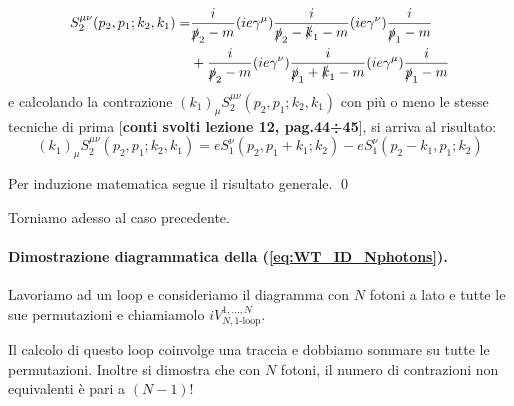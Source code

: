 \documentclass[../main.tex]{subfiles}
\begin{document}
\begin{itemize}
    \begin{align*}
    S_2^{\mu\nu}(p_2,p_1;k_2,k_1) = &\frac{i}{\slashed p_2 - m}(ie\gamma^\mu)\frac{i}{\slashed p_2 - \slashed k_1 - m}(ie\gamma^\nu)\frac{i}{\slashed p_1 - m} \\
    &+ \frac{i}{\slashed p_2 - m}(ie\gamma^\nu)\frac{i}{\slashed p_1 + \slashed k_1 - m}(ie\gamma^\mu)\frac{i}{\slashed p_1 - m}
    \end{align*}
    e calcolando la contrazione \((k_1)_\mu S_2^{\mu\nu}(p_2,p_1;k_2,k_1)\) con più o meno le stesse tecniche di prima [\textbf{conti svolti lezione 12, pag.44÷45}], si arriva al risultato:
    \[ \boxed{(k_1)_\mu S_2^{\mu\nu}(p_2,p_1;k_2,k_1) = eS_1^{\nu}(p_2,p_1+k_1;k_2) - eS_1^{\nu}(p_2-k_1,p_1;k_2)} \]

    Per induzione matematica segue il risultato generale. \qed
\end{itemize}
Torniamo adesso al caso precedente.
\paragraph{Dimostrazione diagrammatica della (\ref{eq:WT_ID_Nphotons}).}
Lavoriamo ad un loop e consideriamo il diagramma con $N$ fotoni a lato e tutte le sue permutazioni e chiamiamolo \(iV_{N, \text{1-loop}}^{1,...,N}\).

Il calcolo di questo loop coinvolge una traccia e dobbiamo sommare su tutte le permutazioni. Inoltre si dimostra che con $N$ fotoni, il numero di contrazioni non equivalenti è pari a $(N-1)!$
\end{document}
